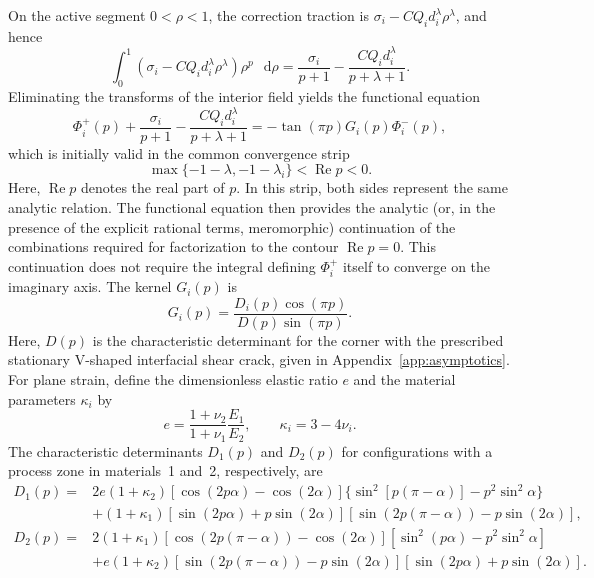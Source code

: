 \documentclass[pdflatex,onecolumn,sn-mathphys-ay]{sn-jnl}
\newcommand{\dd}{\mathop{}\!\mathrm{d}}
\begin{document}
On the active segment $0<\rho<1$, the correction traction is
$\sigma_i-CQ_i d_i^\lambda\rho^\lambda$, and hence
\begin{equation*}
  \int_0^1
  \left(\sigma_i-CQ_i d_i^\lambda\rho^\lambda\right)
  \rho^p\,\dd\rho
  =
  \frac{\sigma_i}{p+1}
  -\frac{CQ_i d_i^\lambda}{p+\lambda+1}.
\end{equation*}
Eliminating the transforms of the interior field yields the functional
equation
\begin{equation}
\label{eq:wiener-hopf-functional}
  \Phi_i^+(p)
  +\frac{\sigma_i}{p+1}
  -\frac{CQ_i d_i^\lambda}{p+\lambda+1}
  =-\tan(\pi p)G_i(p)\Phi_i^-(p),
\end{equation}
which is initially valid in the common convergence strip
\begin{equation*}
  \max\{-1-\lambda,-1-\lambda_i\}
  <\operatorname{Re}p<0.
\end{equation*}
Here, $\operatorname{Re}p$ denotes the real part of $p$. In this strip,
both sides represent the same analytic relation. The functional equation then provides the analytic (or, in the presence of
the explicit rational terms, meromorphic) continuation of the combinations
required for factorization to the contour $\operatorname{Re}p=0$. This
continuation does not require the integral defining $\Phi_i^+$ itself to
converge on the imaginary axis. The
kernel $G_i(p)$ is
\begin{equation*}
  G_i(p)=\frac{D_i(p)\cos(\pi p)}{D(p)\sin(\pi p)}.
\end{equation*}
Here, $D(p)$ is the characteristic determinant for the corner with the
prescribed stationary V-shaped interfacial shear crack, given in
Appendix~\ref{app:asymptotics}.
For plane strain, define the dimensionless elastic ratio $e$ and the
material parameters $\kappa_i$ by
\begin{equation*}
  e=\frac{1+\nu_2}{1+\nu_1}\frac{E_1}{E_2},
  \qquad
  \kappa_i=3-4\nu_i.
\end{equation*}
The characteristic determinants $D_1(p)$ and $D_2(p)$ for configurations
with a process zone in materials~1 and~2, respectively, are
\begin{equation*}
\begin{aligned}
  D_1(p)={}&2e(1+\kappa_2)
    [\cos(2p\alpha)-\cos(2\alpha)]
    \{\sin^2[p(\pi-\alpha)]-p^2\sin^2\alpha\}\\
  &+(1+\kappa_1)
    [\sin(2p\alpha)+p\sin(2\alpha)]
    [\sin(2p(\pi-\alpha))-p\sin(2\alpha)],\\[2pt]
  D_2(p)={}&2(1+\kappa_1)
    [\cos(2p(\pi-\alpha))-\cos(2\alpha)]
    [\sin^2(p\alpha)-p^2\sin^2\alpha]\\
  &+e(1+\kappa_2)
    [\sin(2p(\pi-\alpha))-p\sin(2\alpha)]
    [\sin(2p\alpha)+p\sin(2\alpha)].
\end{aligned}
\end{equation*}
\end{document}
